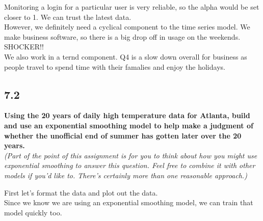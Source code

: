 \documentclass[]{article}
\begin{document}
Monitoring a login for a particular user is very reliable, so the alpha
would be set closer to 1. We can trust the latest data.\\
However, we definitely need a cyclical component to the time series
model. We make business software, so there is a big drop off in usage on
the weekends. SHOCKER!!\\
We also work in a ternd component. Q4 is a slow down overall for
business as people travel to spend time with their famalies and enjoy
the holidays.

\subsection{7.2}\label{section-1}

\textbf{Using the 20 years of daily high temperature data for Atlanta,
build and use an exponential smoothing model to help make a judgment of
whether the unofficial end of summer has gotten later over the 20
years.}\\
\emph{(Part of the point of this assignment is for you to think about
how you might use exponential smoothing to answer this question. Feel
free to combine it with other models if you'd like to. There's certainly
more than one reasonable approach.)}

First let's format the data and plot out the data.\\
Since we know we are using an exponential smoothing model, we can train
that model quickly too.
\end{document}
